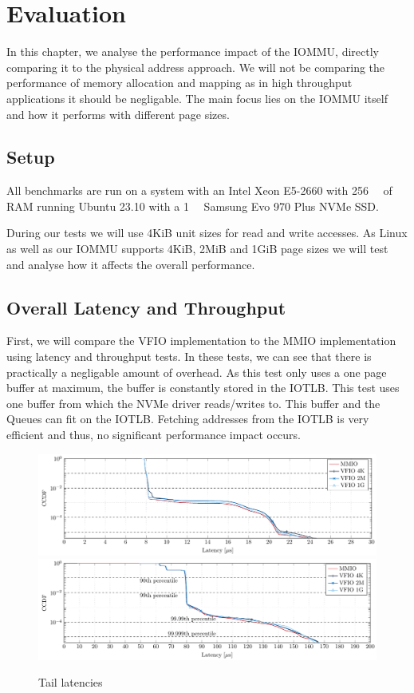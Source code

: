 \chapter{Evaluation}
In this chapter, we analyse the performance impact of the IOMMU, directly comparing it to the physical address approach. We will not be comparing the performance of memory allocation and mapping as in high throughput applications it should be negligable. The main focus lies on the IOMMU itself and how it performs with different page sizes.

\section{Setup}
All benchmarks are run on a system with an Intel Xeon E5-2660 with \qty{256}{\giga\byte} of RAM running Ubuntu 23.10 with a \qty{1}{\tera\byte} Samsung Evo 970 Plus NVMe SSD.

During our tests we will use 4KiB unit sizes for read and write accesses.
As Linux as well as our IOMMU supports 4KiB, 2MiB and 1GiB page sizes we will test and analyse how it affects the overall performance.

\section{Overall Latency and Throughput}
First, we will compare the VFIO implementation to the MMIO implementation using latency and throughput tests. In these tests, we can see that there is practically a negligable amount of overhead. As this test only uses a one page buffer at maximum, the buffer is constantly stored in the IOTLB.
This test uses one buffer from which the NVMe driver reads/writes to. This buffer and the Queues can fit on the IOTLB. Fetching addresses from the IOTLB is very efficient and thus, no significant performance impact occurs.

\begin{figure}
    \centering
     {\includegraphics[width=\textwidth]{figures/latency_ccdf_write} \label{fig:ccdf-write}}
     {\includegraphics[width=\textwidth]{figures/latency_ccdf_read} \label{fig:ccdf-read}}
    \caption{Tail latencies}
    \label{fig:ccdf}
\end{figure}

